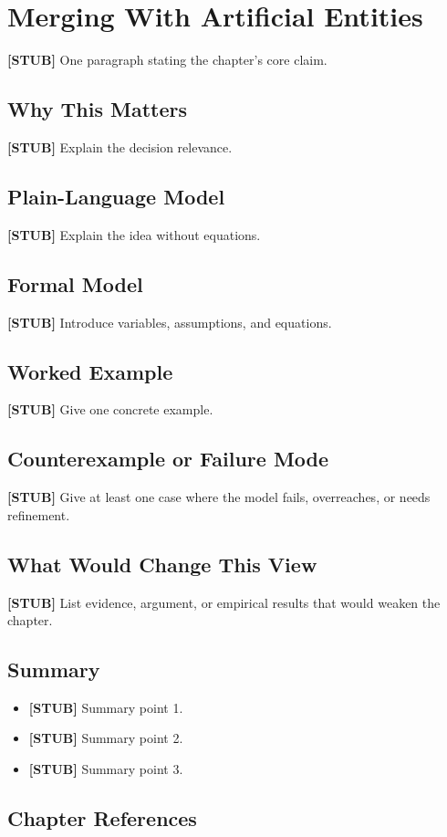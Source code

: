 \chapter{Merging With Artificial Entities}
\label{ch:merging-artificial-entities}

\begin{chapterthesis}
\textbf{[STUB]} One paragraph stating the chapter's core claim.
\end{chapterthesis}

\section{Why This Matters}

\textbf{[STUB]} Explain the decision relevance.

\section{Plain-Language Model}

\textbf{[STUB]} Explain the idea without equations.

\section{Formal Model}

\textbf{[STUB]} Introduce variables, assumptions, and equations.

\section{Worked Example}

\textbf{[STUB]} Give one concrete example.

\section{Counterexample or Failure Mode}

\textbf{[STUB]} Give at least one case where the model fails, overreaches, or needs refinement.

\section{What Would Change This View}

\textbf{[STUB]} List evidence, argument, or empirical results that would weaken the chapter.

\section{Summary}

\begin{itemize}
  \item \textbf{[STUB]} Summary point 1.
  \item \textbf{[STUB]} Summary point 2.
  \item \textbf{[STUB]} Summary point 3.
\end{itemize}

\section*{Chapter References}

